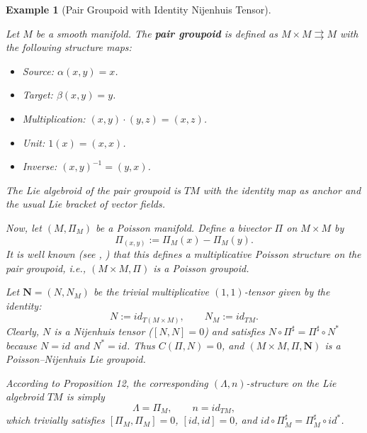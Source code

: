 \documentclass{article}
\newcommand{\II}{\Pi}
\newcommand{\NN}{\mathbf{N}}
\newcommand{\LL}{\Lambda}
\newtheorem{example}[theorem]{Example}
\begin{document}
\vspace{0.5cm}

\begin{example}[Pair Groupoid with Identity Nijenhuis Tensor]
\label{ex:pair}

Let $M$ be a smooth manifold. The \textbf{pair groupoid} is defined as $M \times M \rightrightarrows M$ with the following structure maps:
\begin{itemize}
    \item Source: $\alpha(x, y) = x$.
    \item Target: $\beta(x, y) = y$.
    \item Multiplication: $(x, y) \cdot (y, z) = (x, z)$.
    \item Unit: $1(x) = (x, x)$.
    \item Inverse: $(x, y)^{-1} = (y, x)$.
\end{itemize}

The Lie algebroid of the pair groupoid is $TM$ with the identity map as anchor and the usual Lie bracket of vector fields.

Now, let $(M, \Pi_M)$ be a Poisson manifold. Define a bivector $\II$ on $M \times M$ by
\[
\II_{(x,y)} := \Pi_M(x) - \Pi_M(y).
\]
It is well known (see \cite{A0Weinstein}, \cite{Kiril0Mackenzie2}) that this defines a multiplicative Poisson structure on the pair groupoid, i.e., $(M \times M, \II)$ is a Poisson groupoid.

Let $\NN = (N, N_M)$ be the trivial multiplicative $(1,1)$-tensor given by the identity:
\[
N := id_{T(M \times M)}, \qquad N_M := id_{TM}.
\]
Clearly, $N$ is a Nijenhuis tensor ($[N, N] = 0$) and satisfies $N \circ \II^\sharp = \II^\sharp \circ N^*$ because $N = id$ and $N^* = id$. Thus $C(\II, N) = 0$, and $(M \times M, \II, \NN)$ is a Poisson–Nijenhuis Lie groupoid.

According to Proposition 12, the corresponding $(\LL, n)$-structure on the Lie algebroid $TM$ is simply
\[
\LL = \Pi_M, \qquad n = id_{TM},
\]
which trivially satisfies $[\Pi_M, \Pi_M] = 0$, $[id, id] = 0$, and $id \circ \Pi_M^\sharp = \Pi_M^\sharp \circ id^*$.
\end{example}

\vspace{0.5cm}
\end{document}
